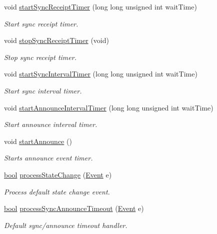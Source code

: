 \begin{DoxyCompactItemize}
void \hyperlink{class_common_port_a25bf37b5026e4b86b138498915330656}{start\+Sync\+Receipt\+Timer} (long long unsigned int wait\+Time)
\begin{DoxyCompactList}\small\item\em Start sync receipt timer. \end{DoxyCompactList}\item 
void \hyperlink{class_common_port_af3b46893f10141406c791c89d3e54b8d}{stop\+Sync\+Receipt\+Timer} (void)
\begin{DoxyCompactList}\small\item\em Stop sync receipt timer. \end{DoxyCompactList}\item 
void \hyperlink{class_common_port_a2033d126c19548eb5ada2d623667e1f2}{start\+Sync\+Interval\+Timer} (long long unsigned int wait\+Time)
\begin{DoxyCompactList}\small\item\em Start sync interval timer. \end{DoxyCompactList}\item 
void \hyperlink{class_common_port_a3938df4f200087f96727e90805c543c9}{start\+Announce\+Interval\+Timer} (long long unsigned int wait\+Time)
\begin{DoxyCompactList}\small\item\em Start announce interval timer. \end{DoxyCompactList}\item 
void \hyperlink{class_common_port_a3119c85c0521ef3f23b4a2419684a015}{start\+Announce} ()
\begin{DoxyCompactList}\small\item\em Starts announce event timer. \end{DoxyCompactList}\item 
\hyperlink{avb__gptp_8h_af6a258d8f3ee5206d682d799316314b1}{bool} \hyperlink{class_common_port_a11047fcdc1e80ee322dba467a051698b}{process\+State\+Change} (\hyperlink{class_event}{Event} e)
\begin{DoxyCompactList}\small\item\em Process default state change event. \end{DoxyCompactList}\item 
\hyperlink{avb__gptp_8h_af6a258d8f3ee5206d682d799316314b1}{bool} \hyperlink{class_common_port_aebebd8986a920f60f1ecc1f8e5a027d0}{process\+Sync\+Announce\+Timeout} (\hyperlink{class_event}{Event} e)
\begin{DoxyCompactList}\small\item\em Default sync/announce timeout handler. \end{DoxyCompactList}\item 

\end{DoxyCompactItemize}

